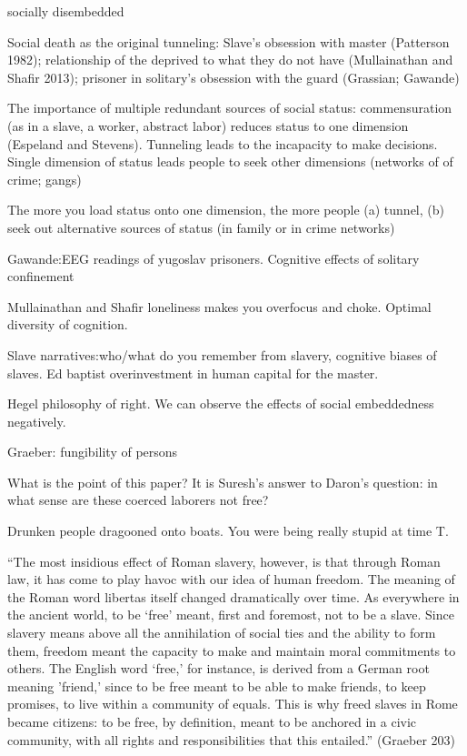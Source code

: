 \documentclass[10pt,a4paper]{article}
\begin{document}
 socially disembedded
 
 Social death as the original tunneling: Slave's obsession with master (Patterson 1982); 
 relationship of the deprived to what they do not have (Mullainathan and Shafir 2013); prisoner 
 in solitary's obsession with the guard (Grassian; Gawande)
 
 The importance of multiple redundant sources of social status: commensuration (as in a slave, a worker, 
 abstract labor) reduces status to one dimension (Espeland and Stevens). Tunneling leads to the incapacity 
 to make decisions. Single dimension of status leads people to seek other dimensions (networks of 
 of crime; gangs) 
 
 The more you load status onto one dimension, the more people (a) tunnel, (b) seek out alternative
 sources of status (in family or in crime networks)
 
 
 Gawande:EEG readings of yugoslav prisoners. Cognitive effects of solitary confinement
 
 Mullainathan and Shafir loneliness makes you overfocus and choke. Optimal diversity of cognition.
 
 
 Slave narratives:who/what do you remember from slavery, cognitive biases of slaves. Ed baptist overinvestment in human capital for the master.
 
 Hegel philosophy of right.
 We can observe the effects of social embeddedness negatively. 
 
 Graeber: fungibility of persons
 
 What is the point of this paper? It is Suresh's answer to Daron's question: 
 in what sense are these coerced laborers not free?
 
 Drunken people dragooned onto boats. You were being really stupid at time T. 
 
 ``The most insidious effect of Roman slavery, however, is that through Roman law, 
 it has come to play havoc with our idea of human freedom. The meaning of the Roman 
 word libertas itself changed dramatically over time. As everywhere in the ancient world, 
 to be `free' meant, first and foremost, not to be a slave. Since slavery means above all 
 the annihilation of social ties and the ability to form them, freedom meant the capacity 
 to make and maintain moral commitments to others. The English word `free,' for instance, 
 is derived from a German root meaning 'friend,' since to be free meant to be able to 
 make friends, to keep promises, to live within a community of equals. This is why freed 
 slaves in Rome became citizens: to be free, by definition, meant to be anchored in a 
 civic community, with all rights and responsibilities that this entailed.'' (Graeber 203)
 
\end{document}
